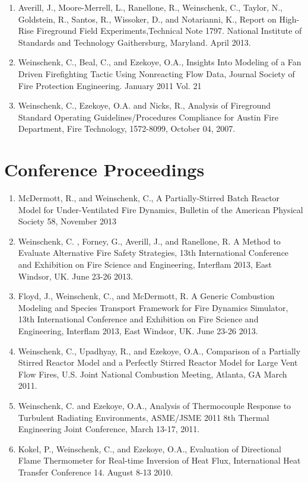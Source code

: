 \documentclass[10pt,letterpaper]{article}
\begin{document}
\begin{enumerate}
\item Averill, J., Moore-Merrell, L., Ranellone, R., Weinschenk, C., Taylor, N., Goldstein, R., Santos, R., Wissoker, D., and Notarianni, K., Report on High-Rise Fireground Field Experiments,Technical Note 1797. National Institute of Standards and Technology Gaithersburg, Maryland. April 2013.
\item Weinschenk, C., Beal, C., and Ezekoye, O.A., Insights Into Modeling of a Fan Driven Firefighting Tactic Using Nonreacting Flow Data, Journal Society of Fire Protection Engineering. January 2011 Vol. 21
\item Weinschenk, C., Ezekoye, O.A. and Nicks, R., Analysis of Fireground Standard Operating Guidelines/Procedures Compliance for Austin Fire Department, Fire Technology, 1572-8099, October 04, 2007.
\end{enumerate}

\clearpage

\section*{Conference Proceedings}
\begin{enumerate}
\item McDermott, R., and Weinschenk, C., A Partially-Stirred Batch Reactor Model for Under-Ventilated Fire Dynamics, Bulletin of the American Physical Society 58, November 2013
\item Weinschenk, C. , Forney, G., Averill, J., and Ranellone, R. A Method to Evaluate Alternative Fire Safety Strategies, 13th International Conference and Exhibition on Fire Science and Engineering, Interflam 2013, East Windsor, UK. June 23-26 2013.
\item Floyd, J., Weinschenk, C., and McDermott, R. A Generic Combustion Modeling and Species Transport Framework for Fire Dynamics Simulator, 13th International Conference and Exhibition on Fire Science and Engineering, Interflam 2013, East Windsor, UK. June 23-26 2013.
\item Weinschenk, C., Upadhyay, R., and Ezekoye, O.A., Comparison of a Partially Stirred Reactor Model and a Perfectly Stirred Reactor Model for Large Vent Flow Fires, U.S. Joint National Combustion Meeting, Atlanta, GA March 2011.
\item Weinschenk, C. and Ezekoye, O.A., Analysis of Thermocouple Response to Turbulent Radiating Environments, ASME/JSME 2011 8th Thermal Engineering Joint Conference, March 13-17, 2011.
\item  Kokel, P., Weinschenk, C., and Ezekoye, O.A., Evaluation of Directional Flame Thermometer for Real-time Inversion of Heat Flux, International Heat Transfer Conference 14. August 8-13 2010.
\end{enumerate}
\end{document}
